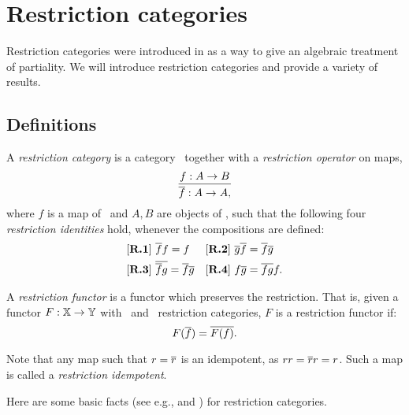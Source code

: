 
\chapter{Restriction categories} %
\label{chap:restriction_categories}


Restriction categories were introduced in
\cite{cockett2002:restcategories1,cockettlack2003:restcategories2,cockettlack2004:restcategories3}
as a way to give an algebraic treatment of partiality. We will introduce restriction
categories and provide a variety of results.

\section{Definitions}
\label{sec:definitions}


\begin{definition}\label{def:restriction_category}
  A \emph{restriction category} is a category \X\ together with a \emph{restriction operator} on
  maps,
  \[
    \infer{\restr{f}:A\to A,}{f:A \to B}
  \]
  where $f$ is a map of \X\ and $A,B$ are objects of \X, such that the
  following four \emph{restriction identities} hold, whenever the
  compositions are defined:
  \begin{align*}
    &[\text{\bfseries {R}.{1}}]\ \overline{f} f = f & &
    [\text{\bfseries {R}.{2}}]\ \overline{g}  \overline{f} = \overline{f}  \overline{g}\\
    &[\text{\bfseries {R}.{3}}]\ \overline{\overline{f}  g} = \overline{f}   \overline{g} & &
    [\text{\bfseries {R}.{4}}]\  f \overline{g} = \overline{f g} f.
  \end{align*}
\end{definition}

\begin{definition}
  A \emph{restriction functor} is a functor which preserves the restriction. That is,
  given a functor $F: \mathbb{X} \to \mathbb{Y}$ with \X\  and \Y\ restriction categories,
  $F$ is a restriction functor if:
  \[
    F(\overline{f}) = \overline{F(f)}.
  \]
\end{definition}

Note that any map such that $r=\overline{r}$ is an idempotent, as $r r = \overline{r} r = r$.
Such a map is called a \emph{restriction idempotent}.

Here are some basic facts (see e.g., \cite{cockett2002:restcategories1} and
\cite{cockett-manes09-boolean-classical-rest-cats}) for restriction categories.

